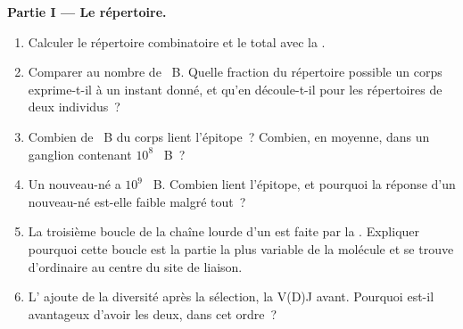 \begin{problem}
\medskip
\noindent\textbf{Partie I --- Le répertoire.}
\begin{enumerate}
  \item Calculer le répertoire combinatoire et le total avec la
        .
  \item Comparer au nombre de ~B. Quelle fraction du
        répertoire possible un corps exprime-t-il à un instant donné, et
        qu'en découle-t-il pour les répertoires de deux individus~?
  \item Combien de ~B du corps lient l'épitope~? Combien, en
        moyenne, dans un ganglion contenant $10^{8}$ ~B~?
  \item Un nouveau-né a $10^{9}$ ~B. Combien lient l'épitope,
        et pourquoi la réponse d'un nouveau-né est-elle faible malgré
        tout~?
  \item La troisième boucle de la chaîne lourde d'un  est faite
        par la . Expliquer pourquoi cette boucle
        est la partie la plus variable de la molécule et se trouve
        d'ordinaire au centre du site de liaison.
  \item L' ajoute de la diversité après la
        sélection, la V(D)J avant. Pourquoi est-il avantageux d'avoir
        les deux, dans cet ordre~?
\end{enumerate}


\end{problem}
